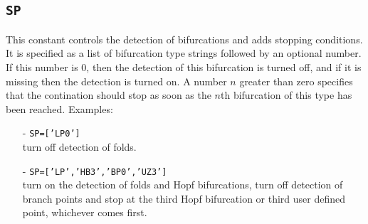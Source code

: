 \documentclass[12pt]{report}
\begin{document}
\subsection{\texttt{SP}}  \label{sec:SP}
This constant controls the detection of bifurcations and adds stopping
conditions. It is specified as a list of bifurcation type strings
followed by an optional number. If this number is 0, then the detection
of this bifurcation is turned off, and if it is missing
then the detection is turned on. A number $n$ greater than zero
specifies that the contination should stop as soon as the $n$th
bifurcation of this type has been reached.
Examples:\\
\begin{itemize}
\item[-] {\tt SP=['LP0']}\\
turn off detection of folds.
\item[-] {\tt SP=['LP','HB3','BP0','UZ3']}\\
turn on the detection of folds and Hopf bifurcations,
turn off detection of branch points and stop at the third Hopf
bifurcation or third user defined point, whichever comes first.
\end{itemize}
 
\end{document}
